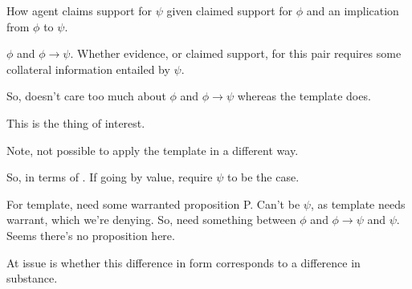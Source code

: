 \begin{note}
  How agent claims support for \(\psi\) given claimed support for \(\phi\) and an implication from \(\phi\) to \(\psi\).

  \(\phi\) and \(\phi \rightarrow \psi\).
  Whether evidence, or claimed support, for this pair requires some collateral information entailed by \(\psi\).

  So, \nI{} doesn't care too much about \(\phi\) and \(\phi \rightarrow \psi\) whereas the template does.

  This is the thing of interest.

  Note, not possible to apply the template in a different way.

  So, in terms of \eiS{}.
  If going by value, require \(\psi\) to be the case.

  For template, need some warranted proposition P.
  Can't be \(\psi\), as template needs warrant, which we're denying.
  So, need something between \(\phi\) and \(\phi \rightarrow \psi\) and \(\psi\).
  Seems there's no proposition here.

  At issue is whether this difference in form corresponds to a difference in substance.
\end{note}

